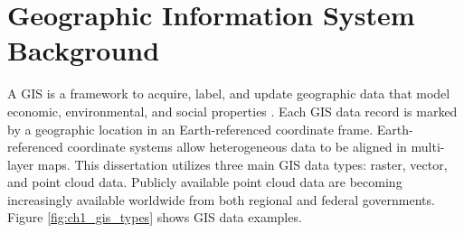 













\section{Geographic Information System Background}

A \acf{GIS} is a framework to acquire, label, and update geographic data that model economic, environmental, and social properties \cite{antenucci_geographic_1991}. Each GIS data record is marked by a geographic location in an Earth-referenced coordinate frame.  Earth-referenced coordinate systems allow heterogeneous data to be aligned in  multi-layer maps. This dissertation utilizes three main \ac{GIS} data types: raster, vector, and point cloud data.  Publicly available point cloud data are becoming increasingly available worldwide from both regional and federal governments. Figure \ref{fig:ch1_gis_types} shows \ac{GIS} data examples.

